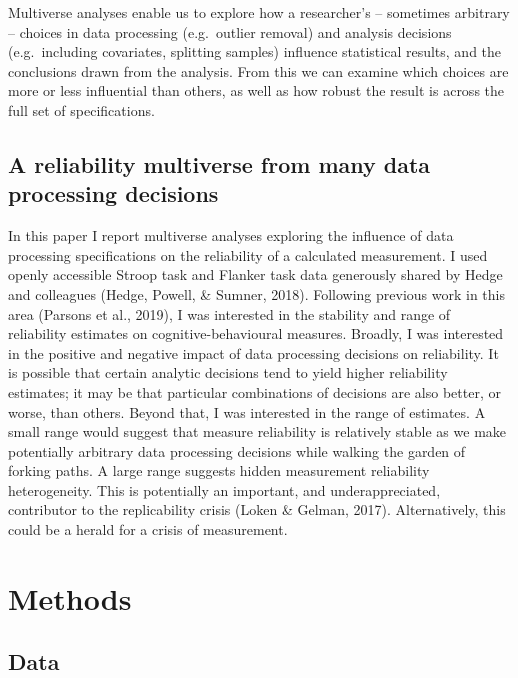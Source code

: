 \documentclass[
  english,
  man,floatsintext]{apa6}
\begin{document}
Multiverse analyses enable us to explore how a researcher's -- sometimes arbitrary -- choices in data processing (e.g.~outlier removal) and analysis decisions (e.g.~including covariates, splitting samples) influence statistical results, and the conclusions drawn from the analysis. From this we can examine which choices are more or less influential than others, as well as how robust the result is across the full set of specifications.

\hypertarget{a-reliability-multiverse-from-many-data-processing-decisions}{%
\subsection{A reliability multiverse from many data processing decisions}\label{a-reliability-multiverse-from-many-data-processing-decisions}}

In this paper I report multiverse analyses exploring the influence of data processing specifications on the reliability of a calculated measurement. I used openly accessible Stroop task and Flanker task data generously shared by Hedge and colleagues (Hedge, Powell, \& Sumner, 2018). Following previous work in this area (Parsons et al., 2019), I was interested in the stability and range of reliability estimates on cognitive-behavioural measures. Broadly, I was interested in the positive and negative impact of data processing decisions on reliability. It is possible that certain analytic decisions tend to yield higher reliability estimates; it may be that particular combinations of decisions are also better, or worse, than others. Beyond that, I was interested in the range of estimates. A small range would suggest that measure reliability is relatively stable as we make potentially arbitrary data processing decisions while walking the garden of forking paths. A large range suggests hidden measurement reliability heterogeneity. This is potentially an important, and underappreciated, contributor to the replicability crisis (Loken \& Gelman, 2017). Alternatively, this could be a herald for a crisis of measurement.

\hypertarget{methods}{%
\section{Methods}\label{methods}}

\hypertarget{data}{%
\subsection{Data}\label{data}}
\end{document}
